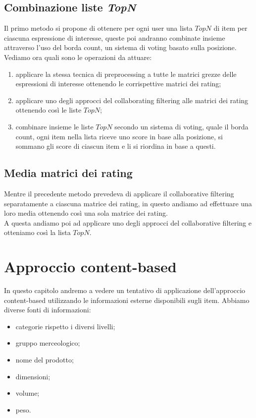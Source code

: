 \subsection{Combinazione liste \textit{TopN}}
Il primo metodo si propone di ottenere per ogni user una lista $TopN$ di item per ciascuna espressione di interesse, queste poi andranno combinate insieme attraverso l'uso del borda count, un sistema di voting basato sulla posizione.
Vediamo ora quali sono le operazioni da attuare:
\begin{enumerate}
    \item applicare la stessa tecnica di preprocessing a tutte le matrici grezze delle espressioni di interesse ottenendo le corrispettive matrici dei rating;
    \item applicare uno degli approcci del collaborating filtering alle matrici dei rating ottenendo così le liste $TopN$;
    \item combinare insieme le liste $TopN$ secondo un sistema di voting, quale il borda count, ogni item nella lista riceve uno score in base alla posizione, si sommano gli score di ciascun item e li si riordina in base a questi.
\end{enumerate}

\subsection{Media matrici dei rating}
Mentre il precedente metodo prevedeva di applicare il collaborative filtering separatamente a ciascuna matrice dei rating, in questo andiamo ad effettuare una loro media ottenendo così una sola matrice dei rating.\\
A questa andiamo poi ad applicare uno degli approcci del collaborative filtering e otteniamo così la lista $TopN$.

\section{Approccio content-based}
In questo capitolo andremo a vedere un tentativo di applicazione dell'approccio content-based utilizzando le informazioni esterne disponibili sugli item.
Abbiamo diverse fonti di informazioni:
\begin{itemize}
    \item categorie rispetto i diversi livelli;
    \item gruppo merceologico;
    \item nome del prodotto;
    \item dimensioni;
    \item volume;
    \item peso.
\end{itemize}

